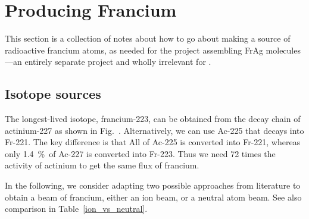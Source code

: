 \section{Producing Francium}

This section is a collection of notes about how to go about making a source of
radioactive francium atoms, as needed for the project assembling FrAg
molecules---an entirely separate project and wholly irrelevant for \CENTREX.

\subsection{Isotope sources}

The longest-lived isotope, francium-223, can be obtained from the decay chain of
actinium-227 as shown in Fig.~. Alternatively, we can use Ac-225 that
decays into Fr-221. The key difference is that All of Ac-225 is converted into
Fr-221, whereas only 1.4~\%\ of Ac-227 is converted into Fr-223. Thus we need 72
times the activity of actinium to get the same flux of francium.

In the following, we consider adapting two possible approaches from literature
to obtain a beam of francium, either an ion beam, or a neutral atom beam. See
also comparison in Table~\ref{ion_vs_neutral}.

\begin{table}[b]
    \caption{Comparing an ion beam to a neutral atom beam.}
    \label{ion_vs_neutral}
\end{table}

